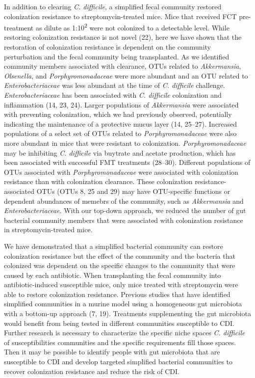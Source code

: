 \documentclass[
  12pt,
]{article}
\begin{document}
In addition to clearing \emph{C. difficile}, a simplified fecal
community restored colonization resistance to streptomycin-treated mice.
Mice that received FCT pre-treatment as dilute as
1:10\textsuperscript{2} were not colonized to a detectable level. While
restoring colonization resistance is not novel (22), here we have shown
that the restoration of colonization resistance is dependent on the
community perturbation and the fecal community being transplanted. As we
identified community members associated with clearance, OTUs related to
\emph{Akkermansia}, \emph{Olsenella}, and \emph{Porphyromonadaceae} were
more abundant and an OTU related to \emph{Enterobacteriaceae} was less
abundant at the time of \emph{C. difficile} challenge.
\emph{Enterobacteriaceae} has been associated with \emph{C. difficile}
colonization and inflammation (14, 23, 24). Larger populations of
\emph{Akkermansia} were associated with preventing colonization, which
we had previously observed, potentially indicating the maintenance of a
protective mucus layer (14, 25--27). Increased populations of a select
set of OTUs related to \emph{Porphyromonadaceae} were also more abundant
in mice that were resistant to colonization. \emph{Porphyromonadaceae}
may be inhibiting \emph{C. difficile} via buytrate and acetate
production, which has been associated with successful FMT treatments
(28--30). Different populations of OTUs associated with
\emph{Porphyromonadaceae} were associated with colonization resistance
than with colonization clearance. These colonization
resistance-associated OTUs (OTUs 8, 25 and 29) may have OTU-specific
functions or dependent abundances of memebrs of the community, such as
\emph{Akkermansia} and \emph{Enterobacteriaceae}. With our top-down
approach, we reduced the number of gut bacterial community members that
were associated with colonization resistance in streptomycin-treated
mice.

We have demonstrated that a simplified bacterial community can restore
colonization resistance but the effect of the community and the bacteria
that colonized was dependent on the specific changes to the community
that were caused by each antibiotic. When transplanting the fecal
community into antibiotic-induced susceptible mice, only mice treated
with streptomycin were able to restore colonization resistance. Previous
studies that have identified simplified communities in a murine model
using a homogeneous gut microbiota with a bottom-up approach (7, 19).
Treatments supplementing the gut microbiota would benefit from being
tested in different communities susceptible to CDI. Further research is
necessary to characterize the specific niche spaces \emph{C. difficile}
of susceptibilities communities and the specific requirements fill those
spaces. Then it may be possible to identify people with gut microbiota
that are susceptible to CDI and develop targeted simplified bacterial
communities to recover colonization resistance and reduce the risk of
CDI.
\end{document}
